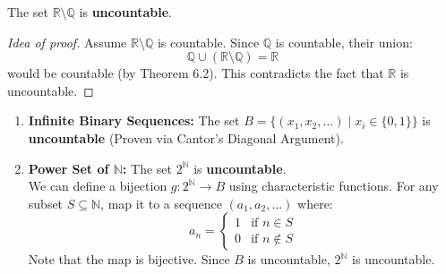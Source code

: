 \documentclass[
	UTF-8,
	11pt, %
	a4paper, %
]{LegrandOrangeBook}
\begin{document}
    \begin{example}
    The set $\mathbb{R} \setminus \mathbb{Q}$ is \textbf{uncountable}.
    \begin{proof}[Idea of proof]
    Assume $\mathbb{R} \setminus \mathbb{Q}$ is countable. Since $\mathbb{Q}$ is countable, their union:
    \[ \mathbb{Q} \cup (\mathbb{R} \setminus \mathbb{Q}) = \mathbb{R} \]
    would be countable (by Theorem 6.2). This contradicts the fact that $\mathbb{R}$ is uncountable.
    \end{proof}
    \end{example}

        

    \newpage

    \begin{example}\quad
    \begin{enumerate}
        \item \textbf{Infinite Binary Sequences:} The set $B = \{ (x_1, x_2, \dots) \mid x_i \in \{0, 1\} \}$ is \textbf{uncountable} (Proven via Cantor's Diagonal Argument).
        
        \item \textbf{Power Set of $\mathbb{N}$:} The set $2^{\mathbb{N}}$ is \textbf{uncountable}. \\
        We can define a bijection $g: 2^{\mathbb{N}} \to B$ using characteristic functions. For any subset $S \subseteq \mathbb{N}$, map it to a sequence $(a_1, a_2, \dots)$ where:
        \[
        a_n = \begin{cases} 
        1 & \text{if } n \in S \\
        0 & \text{if } n \notin S 
        \end{cases}
        \]
        Note that the map is bijective. Since $B$ is uncountable, $2^{\mathbb{N}}$ is uncountable.
    \end{enumerate}
    \end{example}
    
\end{document}
